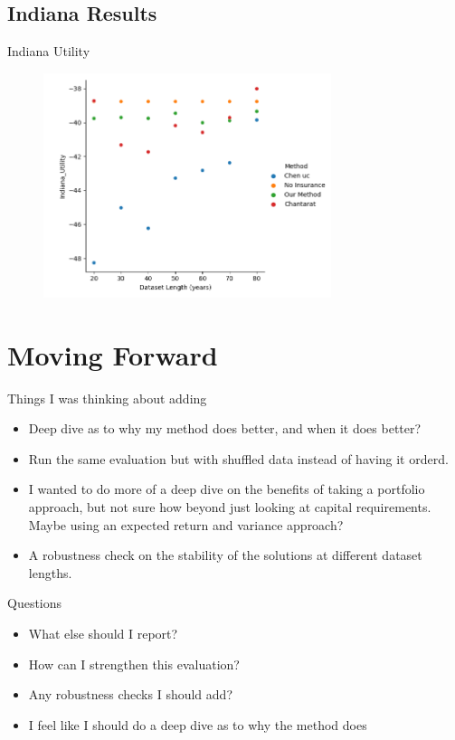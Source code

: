 \documentclass{beamer}
\begin{document}
\subsection*{Indiana Results}
\begin{frame}{Indiana Utility}
    \begin{figure}
        \includegraphics[width=0.75\textwidth]{../../../output/figures/Midwest Evaluation/Indiana_Utility_Length.png}
    \end{figure}
\end{frame}

\section*{Moving Forward}
\begin{frame}{Things I was thinking about adding}
    \begin{itemize}
        \item Deep dive as to why my method does better, and when it does better?
        \item Run the same evaluation but with shuffled data instead of having it orderd. 
       \item I wanted to do more of a deep dive on the benefits of taking a portfolio approach, but not sure how beyond just looking at capital requirements. Maybe using an expected return and variance approach?
        \item A robustness check on the stability of the solutions at different dataset lengths.
    \end{itemize}
    
\end{frame}

\begin{frame}{Questions}
    \begin{itemize}
        \item What else should I report?
        \item How can I strengthen this evaluation?
       \item Any robustness checks I should add?
        \item I feel like I should do a deep dive as to why the method does
    \end{itemize}
    
\end{frame}
\end{document}

